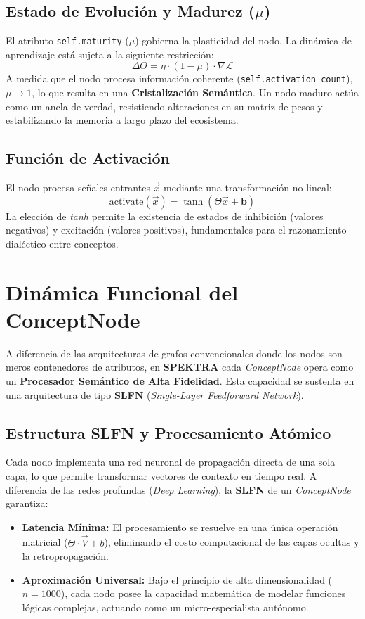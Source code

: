 \documentclass[12pt]{article}
\begin{document}
\subsection{Estado de Evolución y Madurez ($\mu$)}
El atributo \texttt{self.maturity} ($\mu$) gobierna la plasticidad del nodo. La dinámica de aprendizaje está sujeta a la siguiente restricción:
\begin{equation}
    \Delta \Theta = \eta \cdot (1 - \mu) \cdot \nabla \mathcal{L}
\end{equation}
A medida que el nodo procesa información coherente (\texttt{self.activation\_count}), $\mu \to 1$, lo que resulta en una \textbf{Cristalización Semántica}. Un nodo maduro actúa como un ancla de verdad, resistiendo alteraciones en su matriz de pesos y estabilizando la memoria a largo plazo del ecosistema.

\subsection{Función de Activación}
El nodo procesa señales entrantes $\vec{x}$ mediante una transformación no lineal:
\begin{equation}
    \text{activate}(\vec{x}) = \tanh(\Theta \vec{x} + \bm{b})
\end{equation}
La elección de \textit{tanh} permite la existencia de estados de inhibición (valores negativos) y excitación (valores positivos), fundamentales para el razonamiento dialéctico entre conceptos.




\section{Dinámica Funcional del ConceptNode}

A diferencia de las arquitecturas de grafos convencionales donde los nodos son meros contenedores de atributos, en \textbf{SPEKTRA} cada \textit{ConceptNode} opera como un \textbf{Procesador Semántico de Alta Fidelidad}. Esta capacidad se sustenta en una arquitectura de tipo \textbf{SLFN} (\textit{Single-Layer Feedforward Network}).

\subsection{Estructura SLFN y Procesamiento Atómico}
Cada nodo implementa una red neuronal de propagación directa de una sola capa, lo que permite transformar vectores de contexto en tiempo real. A diferencia de las redes profundas (\textit{Deep Learning}), la \textbf{SLFN} de un \textit{ConceptNode} garantiza:
\begin{itemize}
	\item \textbf{Latencia Mínima:} El procesamiento se resuelve en una única operación matricial ($\Theta \cdot \vec{V} + b$), eliminando el costo computacional de las capas ocultas y la retropropagación.
	\item \textbf{Aproximación Universal:} Bajo el principio de alta dimensionalidad ($n=1000$), cada nodo posee la capacidad matemática de modelar funciones lógicas complejas, actuando como un micro-especialista autónomo.
\end{itemize}
\end{document}
